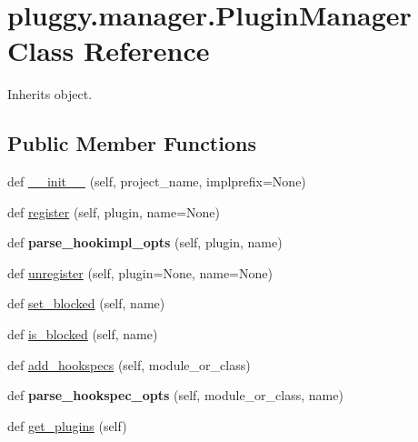 \hypertarget{classpluggy_1_1manager_1_1_plugin_manager}{}\section{pluggy.\+manager.\+Plugin\+Manager Class Reference}
\label{classpluggy_1_1manager_1_1_plugin_manager}


Inherits object.

\subsection*{Public Member Functions}
\begin{DoxyCompactItemize}
\item 
def \hyperlink{classpluggy_1_1manager_1_1_plugin_manager_a43a417b7a5cdde67b91e5a08666f5ce0}{\+\_\+\+\_\+init\+\_\+\+\_\+} (self, project\+\_\+name, implprefix=None)
\item 
def \hyperlink{classpluggy_1_1manager_1_1_plugin_manager_ac62e9aa5f311b991f2e60eb44eebc991}{register} (self, plugin, name=None)
\item 
\mbox{\label{classpluggy_1_1manager_1_1_plugin_manager_a7a1d9c509421c8fc2612f494cfe47d77}} 
def {\bfseries parse\+\_\+hookimpl\+\_\+opts} (self, plugin, name)
\item 
def \hyperlink{classpluggy_1_1manager_1_1_plugin_manager_acd20d8caae1578e75475ab547d87f33e}{unregister} (self, plugin=None, name=None)
\item 
def \hyperlink{classpluggy_1_1manager_1_1_plugin_manager_a3e7953c3c105665df0b5f672858bc635}{set\+\_\+blocked} (self, name)
\item 
def \hyperlink{classpluggy_1_1manager_1_1_plugin_manager_a18e7a296d54664d49d3a3085aa54e99f}{is\+\_\+blocked} (self, name)
\item 
def \hyperlink{classpluggy_1_1manager_1_1_plugin_manager_a4dff3345289a96e3ca7e05f06bcda18e}{add\+\_\+hookspecs} (self, module\+\_\+or\+\_\+class)
\item 
\mbox{\label{classpluggy_1_1manager_1_1_plugin_manager_ab1983fc17667fa45b60219ebd8ba588d}} 
def {\bfseries parse\+\_\+hookspec\+\_\+opts} (self, module\+\_\+or\+\_\+class, name)
\item 
def \hyperlink{classpluggy_1_1manager_1_1_plugin_manager_ae1913212826a600a1aed4b6f60f13106}{get\+\_\+plugins} (self)

\end{DoxyCompactItemize}
